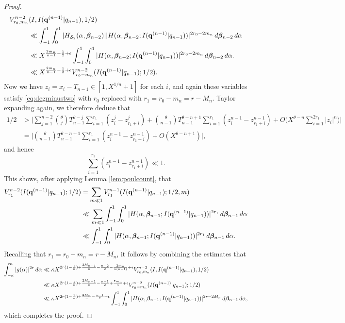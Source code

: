 \documentclass[10pt,a4paper]{amsart}
\renewcommand{\d}{\,{\rm d}}
\begin{document}
\begin{proof}
\begin{align*} 
V_{r_0,m_n}^{n-2} & (I,I({\mathbf{q}^{(n-1)}|q_{n-1}}),1/2) 
\\ 
&\ll \int_{-1}^{1} \int_{0}^{1} |H_{\mathcal{S}_2}(\alpha, \boldsymbol{\beta}_{n-2})| |H(\alpha,\boldsymbol{\beta}_{n-2};I({\mathbf{q}^{(n-1)}|q_{n-1}}) )|^{2r_0-2m_n} \d \boldsymbol{\beta}_{n-2} \d \alpha 
\\ 
& \ll X^{\frac{2m_n}{n-1}-\frac{1}{2}+\epsilon} \int_{-1}^{1} \int_{0}^{1} |H(\alpha,\boldsymbol{\beta}_{n-2};I({\mathbf{q}^{(n-1)}|q_{n-1}}) )|^{2r_0-2m_n} \d \boldsymbol{\beta}_{n-2} \d \alpha. 
\\ 
& \ll X^{\frac{2m_n}{n-1}-\frac{1}{2}+\epsilon} V_{r_0-m_n}^{n-2}(I({\mathbf{q}^{(n-1)}|q_{n-1}});1/2). 
\end{align*}
Now we have $z_i = x_i-T_{n-1} \in [1,X^{1/n}+1]$ for each $i$, and again these variables satisfy \eqref{eq:degminustwo} with $r_0$ replaced with $r_1 = r_0-m_n=r-M_n$. Taylor expanding again, we therefore deduce that 
\begin{align*} 
1/2 & > \Big| \sum_{j=1}^{n-2} \binom{\theta}{j} T_{n-1}^{\theta-j} \sum_{i=1}^{r_1} (z_i^j-z_{r_1+i}^j) + \binom{\theta}{n-1}T_{n-1}^{\theta-n+1} \sum_{i=1}^{r_1} (z_i^{n-1} -z_{r_1+i}^{n-1}) + O\Big(X^{\theta-n}\sum_{i=1}^{2r_1} |z_i|^n\Big) \Big|
\\ 
& = \Big| \binom{\theta}{n-1}T_{n-1}^{\theta-n+1} \sum_{i=1}^{r_1} (z_i^{n-1} -z_{r_1+i}^{n-1}) + O(X^{\theta-n+1}) \Big|,
\end{align*}
and hence 
\[ \sum_{i=1}^{r_1} (z_i^{n-1} -z_{r_1+i}^{n-1}) \ll 1. \]
This shows, after applying Lemma \ref{lem:poulcount}, that 
\begin{align*}
V_{r_1}^{n-2}(I({\mathbf{q}^{(n-1)}|q_{n-1}});1/2) & = \sum_{m \ll 1} V_{r_1}^{n-1}(I({\mathbf{q}^{(n-1)}|q_{n-1}});1/2, m)
\\ 
& \ll \sum_{m \ll 1} \int_{-1}^{1} \int_{0}^{1} |H(\alpha,\boldsymbol{\beta}_{n-1};I({\mathbf{q}^{(n-1)}|q_{n-1}}) )|^{2r_1} \d \boldsymbol{\beta}_{n-1} \d \alpha
\\ 
& \ll \int_{-1}^{1} \int_{0}^{1} |H(\alpha,\boldsymbol{\beta}_{n-1};I({\mathbf{q}^{(n-1)}|q_{n-1}}) )|^{2r_1} \d \boldsymbol{\beta}_{n-1} \d \alpha. 
\end{align*}
Recalling that $r_1 = r_0-m_n = r-M_n$, it follows by combining the estimates that 
\begin{align*} 
\int_{-\kappa}^{\kappa} |g(\alpha)|^{2r} \d\alpha & \ll \kappa X^{2r(1-\frac{1}{n})+\frac{2M_{n-1}}{n}-\frac{n-2}{2}-\frac{2m_{n}}{n(n-1)}+\epsilon} V_{r_0,m_n}^{n-2}(I,I({\mathbf{q}^{(n-1)}|q_{n-1}}),1/2) \\ 
& \ll \kappa X^{2r(1-\frac{1}{n})+\frac{2M_{n-1}}{n}-\frac{n-1}{2}+\frac{2m_{n}}{n}+\epsilon} V_{r_0-m_n}^{n-2}(I({\mathbf{q}^{(n-1)}|q_{n-1}});1/2)
\\ 
& \ll \kappa X^{2r(1-\frac{1}{n})+\frac{2M_{n}}{n}-\frac{n-1}{2}+\epsilon} \int_{-1}^{1} \int_{0}^{1} |H(\alpha,\boldsymbol{\beta}_{n-1};I({\mathbf{q}^{(n-1)}|q_{n-1}}) )|^{2r-2M_n} \d \boldsymbol{\beta}_{n-1} \d \alpha, 
\end{align*}
which completes the proof. 
\end{proof}
\end{document}

